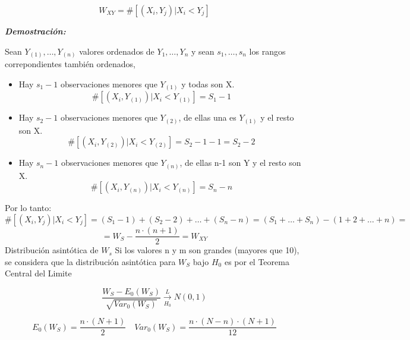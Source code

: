 \[
W_{XY}= \# [(X_i,Y_j) | X_i <Y_j]
\]

\textbf{\textit{Demostración:}}

Sean $Y_{(1)}, \dots, Y_{(n)}$ valores ordenados de $Y_1,\dots,Y_n$ y sean $s_1,\dots,s_n$ los rangos correpondientes también ordenados,
\begin{itemize}
    \item Hay $s_1-1$ observaciones menores que $Y_{(1)}$ y todas son X.
    \[
        \# [(X_i,Y_{(1)}) | X_i <Y_{(1)}]=S_1-1
    \]
    \item Hay $s_2-1$ observaciones menores que $Y_{(2)}$, de ellas una es $Y_{(1)}$ y el resto son X.
    \[
        \# [(X_i,Y_{(2)}) | X_i <Y_{(2)}]=S_2-1-1=S_2-2
    \]
    \item Hay $s_n-1$ observaciones menores que $Y_{(n)}$, de ellas n-1 son Y y el resto son X.
    \[
        \# [(X_i,Y_{(n)}) | X_i <Y_{(n)}]=S_n-n
    \]
\end{itemize} 
Por lo tanto:
\[
    \# [(X_i,Y_j) | X_i <Y_j]=(S_1-1)+(S_2-2)+ \dots +(S_n-n)=(S_1+\dots+S_n)-(1+2+\dots+n)=
\]
\[
    =W_S-\frac{n \cdot (n+1)}{2}=W_{XY}
\]
Distribución asintótica de $W_s$
Si los valores n y m son grandes (mayores que 10), se considera que la distribución asintótica para $W_S$
bajo $H_0$ es por el Teorema Central del Limite

\[
\frac{W_S-E_0(W_S)}{\sqrt{Var_{0}(W_S)}} \xrightarrow[H_0]{L} N(0,1)
\]

\[
E_0(W_S)=\frac{n \cdot (N+1)}{2} \quad Var_0(W_S)=\frac{n \cdot (N-n) \cdot (N+1)}{12}
\]